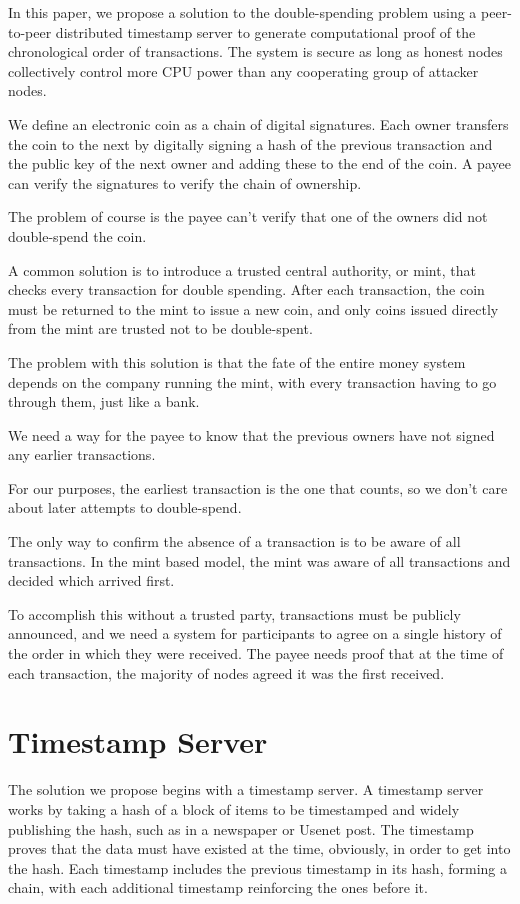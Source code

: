 \documentclass{article}
\begin{document}
In this paper, we propose a solution to the double-spending problem using a peer-to-peer distributed timestamp server to generate computational proof of the chronological order of transactions. The system is secure as long as honest nodes collectively control more CPU power than any cooperating group of attacker nodes.

We define an electronic coin as a chain of digital signatures. Each owner transfers the coin to the next by digitally signing a hash of the previous transaction and the public key of the next owner and adding these to the end of the coin. A payee can verify the signatures to verify the chain of ownership.

The problem of course is the payee can't verify that one of the owners did not double-spend the coin.

A common solution is to introduce a trusted central authority, or mint, that checks every transaction for double spending. After each transaction, the coin must be returned to the mint to issue a new coin, and only coins issued directly from the mint are trusted not to be double-spent.

The problem with this solution is that the fate of the entire money system depends on the company running the mint, with every transaction having to go through them, just like a bank.

We need a way for the payee to know that the previous owners have not signed any earlier transactions.

For our purposes, the earliest transaction is the one that counts, so we don't care about later attempts to double-spend.

The only way to confirm the absence of a transaction is to be aware of all transactions. In the mint based model, the mint was aware of all transactions and decided which arrived first.

To accomplish this without a trusted party, transactions must be publicly announced, and we need a system for participants to agree on a single history of the order in which they were received. The payee needs proof that at the time of each transaction, the majority of nodes agreed it was the first received.

\section{Timestamp Server}

The solution we propose begins with a timestamp server. A timestamp server works by taking a hash of a block of items to be timestamped and widely publishing the hash, such as in a newspaper or Usenet post. The timestamp proves that the data must have existed at the time, obviously, in order to get into the hash. Each timestamp includes the previous timestamp in its hash, forming a chain, with each additional timestamp reinforcing the ones before it.
\end{document}

